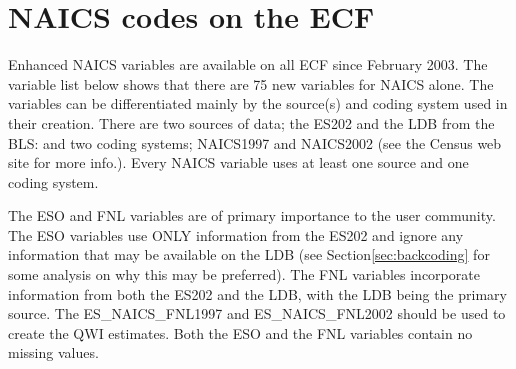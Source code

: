 %
%



%





\section{NAICS codes on the ECF}

Enhanced NAICS variables are available on all ECF since February 2003. The
variable list below shows that there are 75 new variables for NAICS alone.
The variables can be differentiated mainly by the source(s) and coding
system used in their creation. There are two sources of data; the ES202 and
the LDB from the BLS: and two coding systems; NAICS1997 and NAICS2002 (see
the Census web site for more info.). Every NAICS variable uses at least one
source and one coding system.





The ESO and FNL variables are of primary importance to the user community. 
The ESO variables use ONLY information from the ES202 and ignore any 
information that may be available on the LDB (see Section\ref{sec:backcoding} for some analysis on 
why this may be preferred). The FNL variables incorporate information from 
both the ES202 and the LDB, with the LDB being the primary source. The 
ES{\_}NAICS{\_}FNL1997 and ES{\_}NAICS{\_}FNL2002 should be used to create 
the QWI estimates. Both the ESO and the FNL variables contain no missing 
values.


